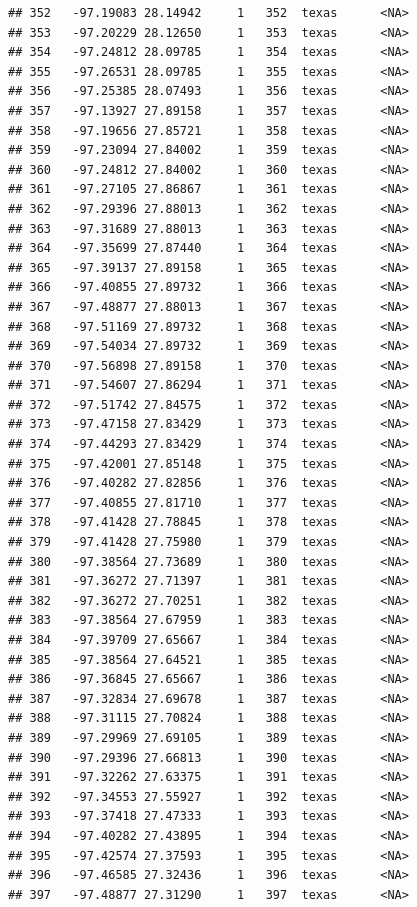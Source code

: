 \documentclass[
]{article}
\begin{document}
\begin{verbatim}
## 352   -97.19083 28.14942     1   352  texas      <NA>
## 353   -97.20229 28.12650     1   353  texas      <NA>
## 354   -97.24812 28.09785     1   354  texas      <NA>
## 355   -97.26531 28.09785     1   355  texas      <NA>
## 356   -97.25385 28.07493     1   356  texas      <NA>
## 357   -97.13927 27.89158     1   357  texas      <NA>
## 358   -97.19656 27.85721     1   358  texas      <NA>
## 359   -97.23094 27.84002     1   359  texas      <NA>
## 360   -97.24812 27.84002     1   360  texas      <NA>
## 361   -97.27105 27.86867     1   361  texas      <NA>
## 362   -97.29396 27.88013     1   362  texas      <NA>
## 363   -97.31689 27.88013     1   363  texas      <NA>
## 364   -97.35699 27.87440     1   364  texas      <NA>
## 365   -97.39137 27.89158     1   365  texas      <NA>
## 366   -97.40855 27.89732     1   366  texas      <NA>
## 367   -97.48877 27.88013     1   367  texas      <NA>
## 368   -97.51169 27.89732     1   368  texas      <NA>
## 369   -97.54034 27.89732     1   369  texas      <NA>
## 370   -97.56898 27.89158     1   370  texas      <NA>
## 371   -97.54607 27.86294     1   371  texas      <NA>
## 372   -97.51742 27.84575     1   372  texas      <NA>
## 373   -97.47158 27.83429     1   373  texas      <NA>
## 374   -97.44293 27.83429     1   374  texas      <NA>
## 375   -97.42001 27.85148     1   375  texas      <NA>
## 376   -97.40282 27.82856     1   376  texas      <NA>
## 377   -97.40855 27.81710     1   377  texas      <NA>
## 378   -97.41428 27.78845     1   378  texas      <NA>
## 379   -97.41428 27.75980     1   379  texas      <NA>
## 380   -97.38564 27.73689     1   380  texas      <NA>
## 381   -97.36272 27.71397     1   381  texas      <NA>
## 382   -97.36272 27.70251     1   382  texas      <NA>
## 383   -97.38564 27.67959     1   383  texas      <NA>
## 384   -97.39709 27.65667     1   384  texas      <NA>
## 385   -97.38564 27.64521     1   385  texas      <NA>
## 386   -97.36845 27.65667     1   386  texas      <NA>
## 387   -97.32834 27.69678     1   387  texas      <NA>
## 388   -97.31115 27.70824     1   388  texas      <NA>
## 389   -97.29969 27.69105     1   389  texas      <NA>
## 390   -97.29396 27.66813     1   390  texas      <NA>
## 391   -97.32262 27.63375     1   391  texas      <NA>
## 392   -97.34553 27.55927     1   392  texas      <NA>
## 393   -97.37418 27.47333     1   393  texas      <NA>
## 394   -97.40282 27.43895     1   394  texas      <NA>
## 395   -97.42574 27.37593     1   395  texas      <NA>
## 396   -97.46585 27.32436     1   396  texas      <NA>
## 397   -97.48877 27.31290     1   397  texas      <NA>

\end{verbatim}
\end{document}
